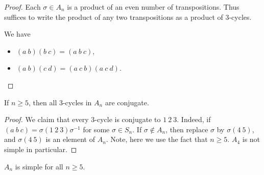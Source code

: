 \begin{proof}
    Each \(\sigma \in A_n\) is a product of an even number of transpositions. Thus suffices to write the product of any two transpositions as a product of 3-cycles.
    
    We have
    \begin{itemize}
        \item \((a~b)(b~c) = (a~b~c)\),
        \item \((a~b)(c~d) = (a~c~b)(a~c~d)\).
    \end{itemize}
\end{proof}
\begin{lemma}
    If \(n \geq 5\), then all 3-cycles in \(A_n\) are conjugate.
    \label{3con}
\end{lemma}
\begin{proof}
    We claim that every 3-cycle is conjugate to \(1~2~3\). Indeed, if \((a~b~c) = \sigma(1~2~3)\sigma^{-1}\) for some \(\sigma\in S_n\).
    If \(\sigma \notin A_n\), then replace \(\sigma\) by \(\sigma(4~5)\), and \(\sigma(4~5)\) is an element of \(A_n\). Note, here we use the fact that \(n\geq 5\). \(A_4\) is not simple in particular.
\end{proof}
\begin{theorem}
    \(A_n\) is simple for all \(n\geq 5\).
\end{theorem}
